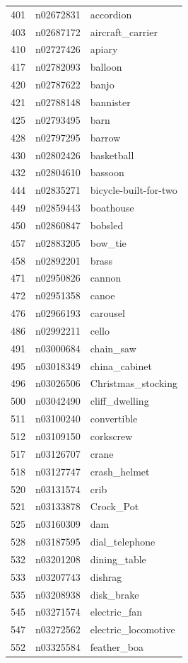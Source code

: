 \begin{table}
\begin{tabular}{cll}
401 & n02672831 & accordion \\
403 & n02687172 & aircraft_carrier \\
410 & n02727426 & apiary \\
417 & n02782093 & balloon \\
420 & n02787622 & banjo \\
421 & n02788148 & bannister \\
425 & n02793495 & barn \\
428 & n02797295 & barrow \\
430 & n02802426 & basketball \\
432 & n02804610 & bassoon \\
444 & n02835271 & bicycle-built-for-two \\
449 & n02859443 & boathouse \\
450 & n02860847 & bobsled \\
457 & n02883205 & bow_tie \\
458 & n02892201 & brass \\
471 & n02950826 & cannon \\
472 & n02951358 & canoe \\
476 & n02966193 & carousel \\
486 & n02992211 & cello \\
491 & n03000684 & chain_saw \\
495 & n03018349 & china_cabinet \\
496 & n03026506 & Christmas_stocking \\
500 & n03042490 & cliff_dwelling \\
511 & n03100240 & convertible \\
512 & n03109150 & corkscrew \\
517 & n03126707 & crane \\
518 & n03127747 & crash_helmet \\
520 & n03131574 & crib \\
521 & n03133878 & Crock_Pot \\
525 & n03160309 & dam \\
528 & n03187595 & dial_telephone \\
532 & n03201208 & dining_table \\
533 & n03207743 & dishrag \\
535 & n03208938 & disk_brake \\
545 & n03271574 & electric_fan \\
547 & n03272562 & electric_locomotive \\
552 & n03325584 & feather_boa \\

\end{tabular}
\end{table}
